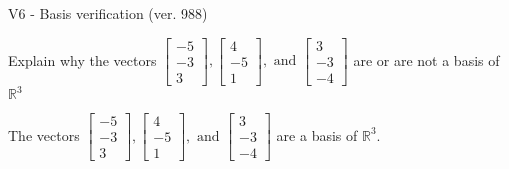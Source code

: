 \begin{exercise}
  \begin{exerciseTitle}V6 - Basis verification (ver. 988)\end{exerciseTitle}
  \begin{exerciseStatement}
    Explain why the vectors \(\left[\begin{array}{r}
-5 \\
-3 \\
3
\end{array}\right] , \left[\begin{array}{r}
4 \\
-5 \\
1
\end{array}\right] , \text{ and } \left[\begin{array}{r}
3 \\
-3 \\
-4
\end{array}\right]\) are or are not a basis of \(\mathbb{R}^3\)	


  \end{exerciseStatement}
  \begin{exerciseAnswer}
   The vectors \(\left[\begin{array}{r}
-5 \\
-3 \\
3
\end{array}\right] , \left[\begin{array}{r}
4 \\
-5 \\
1
\end{array}\right] , \text{ and } \left[\begin{array}{r}
3 \\
-3 \\
-4
\end{array}\right]\) 
  	 are  a basis of \(\mathbb{R}^3\).
  


  \end{exerciseAnswer}
\end{exercise}